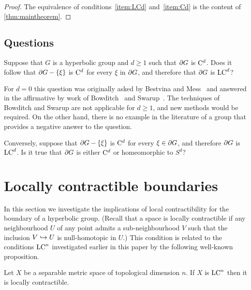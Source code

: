 \documentclass[a4paper]{article}
\begin{document}
\begin{proof}
 The equivalence of conditions~\ref{item:LCd} and~\ref{item:Cd} is the content 
 of \cref{thm:maintheorem}.
\end{proof}

\subsection{Questions}

\begin{question}
  Suppose that $G$ is a hyperbolic group and $d\geq 1$ such that $\partial G$ 
  is $\mathrm{C}^{d}$.  Does it follow that $\partial G - \left\{\xi\right\}$ is $\mathrm{C}^{d}$ for every 
  $\xi$ in $\partial G$, and therefore that $\partial G$ is $\mathrm{LC}^{d}$?
\end{question}

For $d = 0$ this question was originally asked by Bestvina and 
Mess~\cite{bestvinamess91} and answered in the affirmative by work of 
Bowditch~\cite{bowditch98b} and Swarup~\cite{swarup96}. The techniques of
Bowditch and Swarup are not applicable for $d\geq 1$, and new methods would be
required. On the other hand, there is no example in the literature of a group
that provides a negative answer to the question.

\begin{question}
  Conversely, suppose that $\partial G - \left\{\xi\right\}$ is $\mathrm{C}^{d}$ for every 
  $\xi\in\partial G$, and therefore $\partial G$ is $\mathrm{LC}^{d}$. Is it true that 
  $\partial G$ is either $\mathrm{C}^{d}$ or homeomorphic to $S^d$?
\end{question}

\section{Locally contractible boundaries}

In this section we investigate the implications of local contractibility for
the boundary of a hyperbolic group. (Recall that a space is locally
contractible if any neighbourhood $U$ of any point admits a sub-neighbourhood
$V$ such that the inclusion $V\hookrightarrow U$ is null-homotopic in $U$.) This condition
is related to the conditions $\mathrm{LC}^{n}$ investigated earlier in this paper by the
following well-known proposition.

\begin{proposition}%
  Let $X$ be a separable metric space of topological dimension $n$. If $X$ is
  $\mathrm{LC}^{n}$ then it is locally contractible.
\end{proposition}
\end{document}
